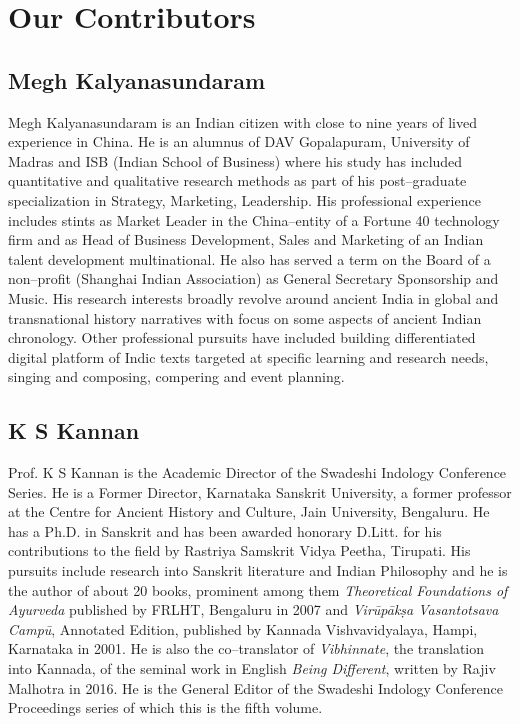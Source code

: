 
\chapter*{Our Contributors }\label{contributors}

\vskip 4pt

\section*{Megh Kalyanasundaram}

\vskip 4pt

Megh Kalyanasundaram is an Indian citizen with close to nine years of lived experience in China. He is an alumnus of DAV Gopalapuram, University of Madras and ISB (Indian School of Business) where his study has included quantitative and qualitative research methods as part of his post–graduate specialization in Strategy, Marketing, Leadership. His professional experience includes stints as Market Leader in the China–entity of a Fortune 40 technology firm and as Head of Business Development, Sales and Marketing of an Indian talent development multinational. He also has served a term on the Board of a non–profit (Shanghai Indian Association) as General Secretary Sponsorship and Music. His research interests broadly revolve around ancient India in global and transnational history narratives with focus on some aspects of ancient Indian chronology. Other professional pursuits have included building differentiated digital platform of Indic texts targeted at specific learning and research needs, singing and composing, compering and event planning.

\section*{K S Kannan}

Prof. K S Kannan is the Academic Director of the Swadeshi Indology Conference Series. He is a Former Director, Karnataka Sanskrit University, a former professor at the Centre for Ancient History and Culture, Jain University, Bengaluru. He has a Ph.D. in Sanskrit and has been awarded honorary D.Litt. for his contributions to the field by Rastriya Samskrit Vidya Peetha, Tirupati. His pursuits include research into Sanskrit literature and Indian Philosophy and he is the author of about 20 books, prominent among them \textit{Theoretical Foundations of Ayurveda} published by FRLHT, Bengaluru in 2007 and \textit{Virūpākṣa Vasantotsava Campū}, Annotated Edition, published by Kannada Vishvavidyalaya, Hampi, Karnataka in 2001. He is also the co–translator of \textit{Vibhinnate}, the translation into Kannada, of the seminal work in English \textit{Being Different}, written by Rajiv Malhotra in 2016. He is the General Editor of the Swadeshi Indology Conference Proceedings series of which this is the fifth volume.

